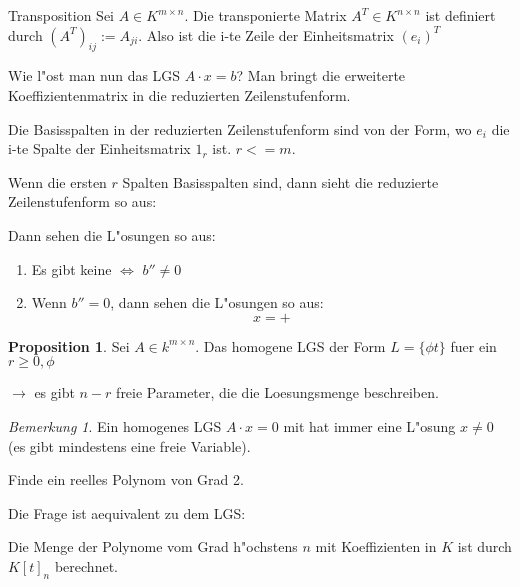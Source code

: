 \documentclass[fontsize=11pt,paper=a4,BCOR=0mm,DIV=11,automark,headsepline]{scrbook}
\theoremstyle{remark}
\theoremstyle{definition}
\newtheorem*{proposition}{Proposition}
\theoremstyle{proof}
\theoremstyle{remark}
\newtheorem*{bem}{Bemerkung}
\begin{document}
\begin{definition}{Transposition}{}
Sei \(A\in K^{m\times n}\). Die transponierte Matrix \(A^{T}\in K^{n\times n}\) ist
definiert durch \((A^T)_{ij}:=A_{ji}\). Also ist die i-te Zeile der Einheitsmatrix \((e_i)^T\)
\end{definition}

Wie l"ost man nun das LGS \(A\cdot x=b\)? Man bringt die erweiterte
Koeffizientenmatrix in die reduzierten Zeilenstufenform.

\begin{relation}
Die Basisspalten in der reduzierten Zeilenstufenform sind von der Form, wo \(e_i\)
die i-te Spalte der Einheitsmatrix \(1_r\) ist. \(r <= m\).
\end{relation}

Wenn die ersten \(r\) Spalten Basisspalten sind, dann sieht die reduzierte
Zeilenstufenform so aus:


Dann sehen die L"osungen so aus:
\begin{relation}
\begin{enumerate}
\item Es gibt keine \(\iff\) \(b''\not= 0\)
\item Wenn \(b''=0\), dann sehen die L"osungen so aus: \[x=+\]
\end{enumerate}
\end{relation}

\begin{proposition}
Sei \(A\in k^{m\times n}\). Das homogene LGS der Form \(L=\{\phi
t \}\) fuer ein \(r\geq 0, \phi\)

\(\rightarrow\) es gibt \(n-r\) freie Parameter, die die Loesungsmenge beschreiben.
\end{proposition}

\begin{bem}
 Ein homogenes LGS \(A\cdot x=0\) mit  hat immer eine L"osung \(x\not=
0\) (es gibt mindestens eine freie Variable).
\end{bem}

\begin{exa} \label{}
Finde ein reelles Polynom von Grad 2.

Die Frage ist aequivalent zu dem LGS:
\end{exa}

\begin{definition}{}{}
Die Menge der Polynome vom Grad h"ochstens \(n\) mit Koeffizienten in \(K\) ist
durch \(K[t]_n\) berechnet.
\end{definition}
\end{document}
